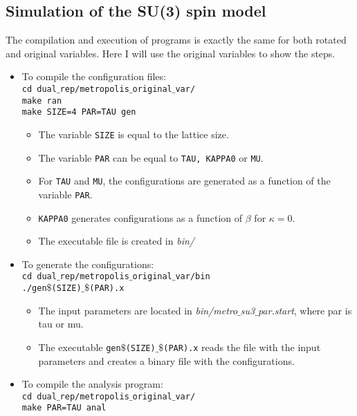 \documentclass[a4paper,10pt]{report}
\begin{document}
\subsection*{Simulation of the SU(3) spin model}
The compilation and execution of programs is exactly the same for both rotated and original variables.
Here I will use the original variables to show the steps.
\begin{itemize}[leftmargin=*]
 \item To compile the configuration files:
 \vspace*{2mm}
 \texttt{
 \\cd dual$\_$rep/metropolis$\_$original$\_$var/
 \\make ran   
 \\make SIZE=4 PAR=TAU gen
 }

 \begin{itemize}[leftmargin=*]
  \item The variable {\tt SIZE} is equal to the lattice size.
  \item The variable {\tt PAR} can be equal to {\tt TAU, KAPPA0} or {\tt MU}.
  \item For {\tt TAU} and {\tt MU}, the configurations are generated as a function of the variable {\tt PAR}.
  \item {\tt KAPPA0} generates configurations as a function of $\beta$ for $\kappa = 0$.
  \item The executable file is created in {\it bin/}
 \end{itemize}
 
 \item To generate the configurations:
 \vspace*{2mm}
 \texttt{
 \\cd dual$\_$rep/metropolis$\_$original$\_$var/bin
 \\./gen$\$$(SIZE)$\_\$$(PAR).x   
 }

 \begin{itemize}[leftmargin=*]
  \item The input parameters are located in {\it bin/metro$\_$su3$\_$par.start}, where par is tau or mu.
  \item The executable {\tt gen$\$$(SIZE)$\_\$$(PAR).x} reads the file with the input parameters and creates
  a binary file with the configurations.
 \end{itemize}
 
 
 
 \item To compile the analysis program:
 \vspace*{2mm}
 \texttt{
 \\cd dual$\_$rep/metropolis$\_$original$\_$var/   
 \\make PAR=TAU anal
 }


\end{itemize}
\end{document}
